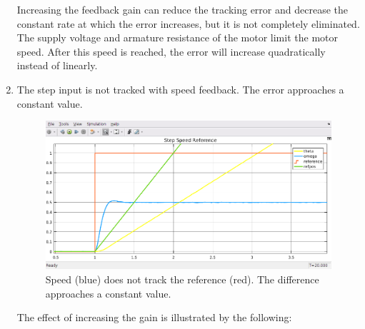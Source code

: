 \documentclass[11pt,a4paper]{article}
\begin{document}
\begin{enumerate}
Increasing the feedback gain can reduce the tracking error and decrease the constant rate at which the error increases, but it is not completely eliminated. The supply voltage and armature resistance of the motor limit the motor speed. After this speed is reached, the error will increase quadratically instead of linearly.

	\item The step input is not tracked with speed feedback. The error approaches a constant value.
	
	\begin{figure}[h!]
	\includegraphics[width=\textwidth]{imglab/lab4sol_stepspeedtraj.png}
	\caption{Speed (blue) does not track the reference (red). The difference approaches a constant value.}
	\end{figure}	
	
		The effect of increasing the gain is illustrated by the following:
	

\end{enumerate}
\end{document}
